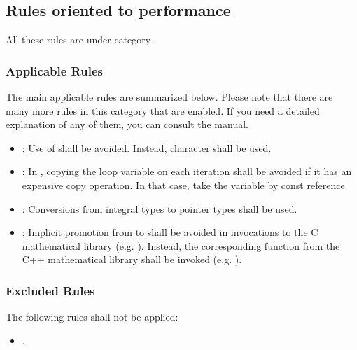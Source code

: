 \subsection{Rules oriented to performance}

All these rules are under category
.

\subsubsection{Applicable Rules}

The main applicable rules are summarized below. Please note that there are many more
rules in this category that are enabled. If you need a detailed explanation of any of them,
you can consult the  manual.

\begin{itemize}

\item {}:
Use of  shall be avoided.
Instead, character  shall be used.

\item {}:
In , copying the loop variable on each iteration
shall be avoided if it has an expensive copy operation. In that case, take the
variable by const reference.

\item {}:
Conversions from integral types to pointer types shall be used.

\item {}:
Implicit promotion from  to  shall be avoided
in invocations to the C mathematical library (e.g. ).
Instead, the corresponding function from the C++ mathematical library
shall be invoked (e.g. ).

\end{itemize}

\subsubsection{Excluded Rules}

The following rules shall not be applied:

\begin{itemize}

\item {}.

\end{itemize}

